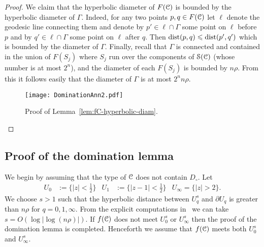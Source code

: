 \documentclass[reqno]{amsart}
\renewcommand\~[1]{\widetilde{#1}}
\def\cS{{\mathcal S}} \def\cSc{{\mathcal S \mathcal C}}
\begin{document}
\begin{proof}
  We claim that the hyperbolic diameter of $F({\mathcal C})$ is bounded by the
  hyperbolic diameter of $\Gamma$. Indeed, for any two points
  $p,q\in F({\mathcal C})$ let $\ell$ denote the geodesic line connecting them
  and denote by $p'\in\ell\cap\Gamma$ some point on $\ell$ before $p$
  and by $q'\in\ell\cap\Gamma$ some point on $\ell$ after $q$. Then
  $\operatorname{dist}(p,q)\leqslant\operatorname{dist}(p',q')$ which is bounded by the diameter of
  $\Gamma$. Finally, recall that $\Gamma$ is connected and contained
  in the union of $F(S_j)$ where $S_j$ run over the components of
  $\cS(\cC)$ (whose number is at most $2^n$), and the diameter of each
  $F(S_j)$ is bounded by $n\rho$. From this it follows easily
  that the diameter of $\Gamma$ is at most $2^nn\rho$.
  \begin{figure}
    \centering
    \texttt{[image: DominationAnn2.pdf]}
    \caption{Proof of Lemma~\ref{lem:fC-hyperbolic-diam}.}
    \label{fig:DominationAnn}
  \end{figure}
\end{proof}


\subsection{Proof of the domination lemma}
\label{sec:domination-proof}

We begin by assuming that the type of ${\mathcal C}$ does not contain
$D_\circ$. Let
\begin{align}\label{eq:U01infty}
  U_0 &:= \{|z|<\tfrac12\} & U_1&:= \{|z-1|<\tfrac12\} & U_\infty = \{|z|>2\}.
\end{align}
We choose $s>1$ such that the hyperbolic distance between $U_q^s$ and
$\partial U_q$ is greater than $n\rho$ for $q=0,1,\infty$. From the
explicit computations in~ we can take
$s=O(\log|\log(n\rho)|)$. If $f({\mathcal C})$ does not meet $U_0^s$ or
$U_\infty^s$ then the proof of the domination lemma is
completed. Henceforth we assume that $f({\mathcal C})$ meets both $U_0^s$ and
$U_\infty^s$.
\end{document}
